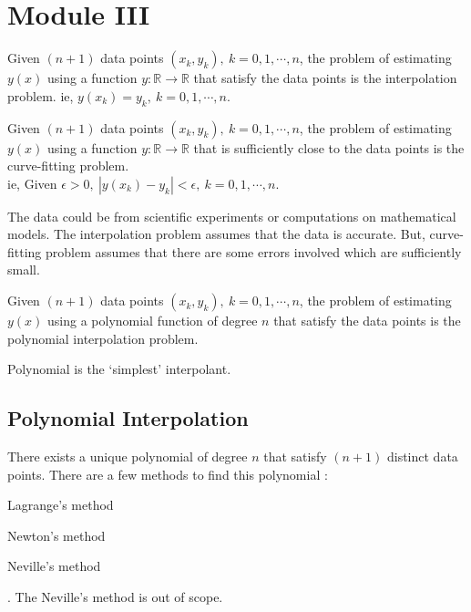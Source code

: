 \chapter{Module III}
\begin{definition}
	Given $(n+1)$ data points $(x_k, y_k),\ k = 0,1,\cdots,n$, the problem of estimating $y(x)$ using a function $y : \mathbb{R} \to \mathbb{R}$ that satisfy the data points is the interpolation problem. ie, $y(x_k) = y_k,\ k = 0,1,\cdots,n$.
\end{definition}
\begin{definition}
	Given $(n+1)$ data points $(x_k,y_k),\ k = 0,1,\cdots,n$, the problem of estimating $y(x)$ using a function $y : \mathbb{R} \to \mathbb{R}$ that is sufficiently close to the data points is the curve-fitting problem.\\ ie, Given $\epsilon > 0,\ |y(x_k)-y_k| < \epsilon,\ k = 0,1,\cdots,n$.
\end{definition}
\begin{remark}
\begin{commentary}
The data could be from scientific experiments or computations on mathematical models. The interpolation problem assumes that the data is accurate. But, curve-fitting problem assumes that there are some errors involved which are sufficiently small.
\end{commentary}
\end{remark}
\begin{definition}
	Given $(n+1)$ data points $(x_k,y_k),\ k = 0,1,\cdots,n$, the problem of estimating $y(x)$ using a polynomial function of degree $n$ that satisfy the data points is the polynomial interpolation problem.
\end{definition}
\begin{remark}
	Polynomial is the `simplest' interpolant.\cite[3.2]{kiusalaas}
\end{remark}

\section{Polynomial Interpolation}
There exists a unique polynomial of degree $n$ that satisfy $(n+1)$ distinct data points. There are a few methods to find this polynomial : 
\begin{enumerate*}
	\item Lagrange's method
	\item Newton's method
	\item Neville's method
\end{enumerate*}. The Neville's method is out of scope.

